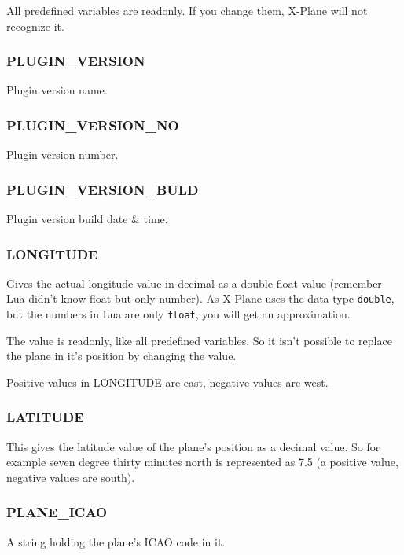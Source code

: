 \documentclass[11pt,parskip=half,a4paper]{scrartcl}
\begin{document}
All predefined variables are readonly. If you change them, X-Plane will not recognize it.

\subsubsection{PLUGIN\_VERSION}

Plugin version name.


\subsubsection{PLUGIN\_VERSION\_NO}

Plugin version number.


\subsubsection{PLUGIN\_VERSION\_BULD}

Plugin version build date \& time.


\subsubsection{LONGITUDE}

Gives the actual longitude value in decimal as a double float value (remember Lua didn't know float but only number). As X-Plane uses the data type \verb|double|, but the numbers in Lua are only \verb|float|, you will get an approximation.

The value is readonly, like all predefined variables. So it isn't possible to replace the plane in it's position by changing the value.

Positive values in LONGITUDE are east, negative values are west.

\subsubsection{LATITUDE}

This gives the latitude value of the plane's position as a decimal value. So for example seven degree thirty minutes north is represented as 7.5 (a positive value, negative values are south).

\subsubsection{PLANE\_ICAO}

A string holding the plane's ICAO code in it.
\end{document}
